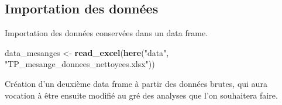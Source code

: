 \documentclass[
  french,
]{article}
\newenvironment{Shaded}{\begin{snugshade}}{\end{snugshade}}
\newcommand{\FunctionTok}[1]{\textcolor[rgb]{0.13,0.29,0.53}{\textbf{#1}}}
\newcommand{\NormalTok}[1]{#1}
\newcommand{\OtherTok}[1]{\textcolor[rgb]{0.56,0.35,0.01}{#1}}
\newcommand{\StringTok}[1]{\textcolor[rgb]{0.31,0.60,0.02}{#1}}
\begin{document}
\subsection{Importation des données}\label{importation-des-donnuxe9es}

Importation des données conservées dans un data frame.

\begin{Shaded}
\begin{Highlighting}[]
\NormalTok{data\_mesanges }\OtherTok{\textless{}{-}} \FunctionTok{read\_excel}\NormalTok{(}\FunctionTok{here}\NormalTok{(}\StringTok{"data"}\NormalTok{, }\StringTok{"TP\_mesange\_donnees\_nettoyees.xlsx"}\NormalTok{))}
\end{Highlighting}
\end{Shaded}

Création d'un deuxième data frame à partir des données brutes, qui aura
vocation à être ensuite modifié au gré des analyses que l'on souhaitera
faire.
\end{document}
